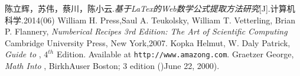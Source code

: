\documentclass{ctexart}
\begin{document}

\begin{thebibliography}{99}
	陈立辉，苏伟，蔡川，陈小云.\emph{基于LaTex的Web数学公式提取方法研究}[J].计算机科学.2014(06)
	William H. Press,Saul A. Teukolsky,
	William T. Vetterling, Brian P. Flannery,
	\emph{Numberical Recipes 3rd Edition:
	The Art of Scientific Computing}
	Cambridge University Press, New York,2007.
	 Kopka Helmut, W. Daly Patrick,
	\emph{Guide to \LaTex}, $4^{th}$ Edition.
	Available at \texttt{http://www.amazong.com}.
	 Graetzer George, \emph{Math Into \LaTex},
	BirkhAuser Boston; 3 edition ()June 22, 2000).
\end{thebibliography}

\end{document}
